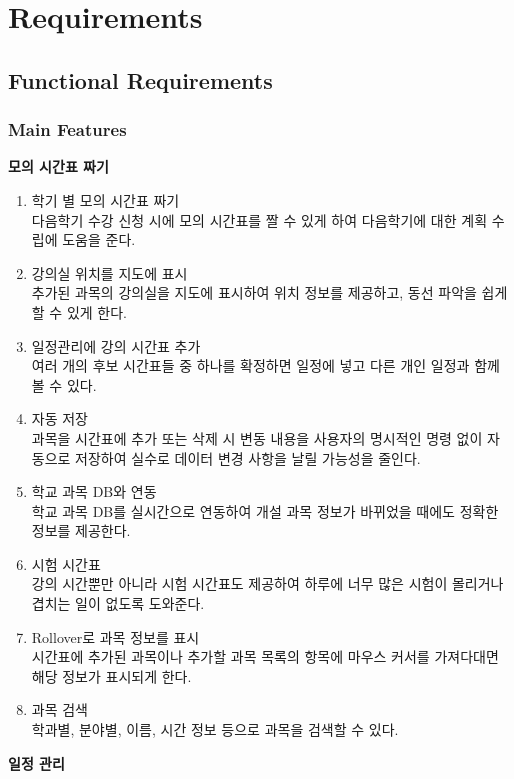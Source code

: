 \documentclass[a4paper,titlepage]{article}
\begin{document}
\pagebreak
\section{Requirements}
\subsection{Functional Requirements}
\subsubsection{Main Features}
\begin{funcreq}
	\item\textbf{모의 시간표 짜기}
	\begin{enumerate}
		\item 학기 별 모의 시간표 짜기\\
		다음학기 수강 신청 시에 모의 시간표를 짤 수 있게 하여 다음학기에 대한 계획 수립에 도움을 준다. 
		\item 강의실 위치를 지도에 표시\\
		추가된 과목의 강의실을 지도에 표시하여 위치 정보를 제공하고, 동선 파악을 쉽게 할 수 있게 한다. 
		\item 일정관리에 강의 시간표 추가\\
		여러 개의 후보 시간표들 중 하나를 확정하면 일정에 넣고 다른 개인 일정과 함께 볼 수 있다. 
		\item 자동 저장\\
		과목을 시간표에 추가 또는 삭제 시 변동 내용을 사용자의 명시적인 명령 없이 자동으로 저장하여 실수로 데이터 변경 사항을 날릴 가능성을 줄인다. 
		\item 학교 과목 DB와 연동\\
		학교 과목 DB를 실시간으로 연동하여 개설 과목 정보가 바뀌었을 때에도 정확한 정보를 제공한다. 
		\item 시험 시간표\\
		강의 시간뿐만 아니라 시험 시간표도 제공하여 하루에 너무 많은 시험이 몰리거나 겹치는 일이 없도록 도와준다. 
		\item Rollover로 과목 정보를 표시\\
		시간표에 추가된 과목이나 추가할 과목 목록의 항목에 마우스 커서를 가져다대면 해당 정보가 표시되게 한다.
		\item 과목 검색\\
		학과별, 분야별, 이름, 시간 정보 등으로 과목을 검색할 수 있다.
	\end{enumerate}
	\item\textbf{일정 관리}
	\begin{enumerate}

\end{enumerate}
\end{funcreq}
\end{document}
